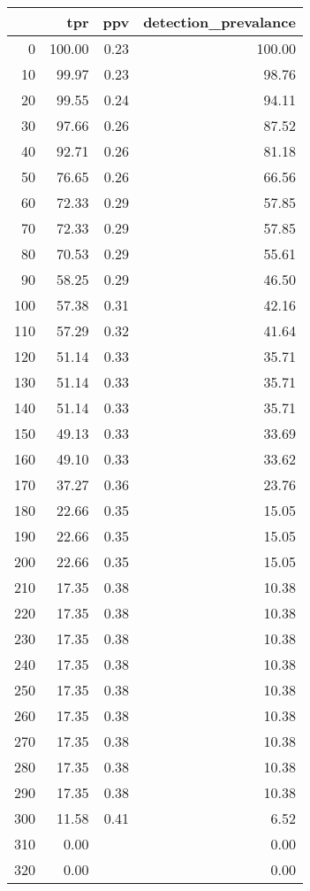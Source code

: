 \begin{table}[ht]
\centering
\begin{tabular}{rrrr}
  \hline
 & tpr & ppv & detection\_prevalance \\ 
  \hline
0 & 100.00 & 0.23 & 100.00 \\ 
  10 & 99.97 & 0.23 & 98.76 \\ 
  20 & 99.55 & 0.24 & 94.11 \\ 
  30 & 97.66 & 0.26 & 87.52 \\ 
  40 & 92.71 & 0.26 & 81.18 \\ 
  50 & 76.65 & 0.26 & 66.56 \\ 
  60 & 72.33 & 0.29 & 57.85 \\ 
  70 & 72.33 & 0.29 & 57.85 \\ 
  80 & 70.53 & 0.29 & 55.61 \\ 
  90 & 58.25 & 0.29 & 46.50 \\ 
  100 & 57.38 & 0.31 & 42.16 \\ 
  110 & 57.29 & 0.32 & 41.64 \\ 
  120 & 51.14 & 0.33 & 35.71 \\ 
  130 & 51.14 & 0.33 & 35.71 \\ 
  140 & 51.14 & 0.33 & 35.71 \\ 
  150 & 49.13 & 0.33 & 33.69 \\ 
  160 & 49.10 & 0.33 & 33.62 \\ 
  170 & 37.27 & 0.36 & 23.76 \\ 
  180 & 22.66 & 0.35 & 15.05 \\ 
  190 & 22.66 & 0.35 & 15.05 \\ 
  200 & 22.66 & 0.35 & 15.05 \\ 
  210 & 17.35 & 0.38 & 10.38 \\ 
  220 & 17.35 & 0.38 & 10.38 \\ 
  230 & 17.35 & 0.38 & 10.38 \\ 
  240 & 17.35 & 0.38 & 10.38 \\ 
  250 & 17.35 & 0.38 & 10.38 \\ 
  260 & 17.35 & 0.38 & 10.38 \\ 
  270 & 17.35 & 0.38 & 10.38 \\ 
  280 & 17.35 & 0.38 & 10.38 \\ 
  290 & 17.35 & 0.38 & 10.38 \\ 
  300 & 11.58 & 0.41 & 6.52 \\ 
  310 & 0.00 &  & 0.00 \\ 
  320 & 0.00 &  & 0.00 \\ 
   \hline
\end{tabular}
\end{table}
